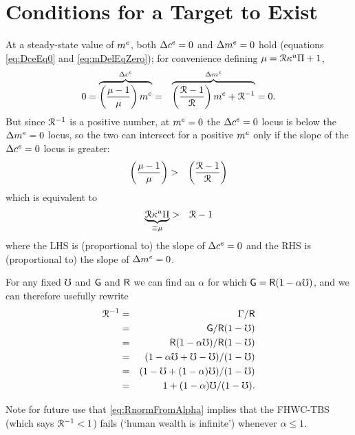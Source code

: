 \message{ !name(TractableBufferStock.tex)}\documentclass{handout}
\begin{document}
\section{Conditions for a Target to Exist}\label{sec:mTargExists}
 
At a steady-state value of $m^{e}$, both $\Delta c^{e}=0$ and $\Delta m^{e}=0$ hold (equations \eqref{eq:DceEq0} and \eqref{eq:mDelEqZero}); for convenience defining $\mu = \mathcal{R} \kappa^{u} \Pi + 1$, 
\begin{eqnarray}
  0 = \overbrace{\left(\frac{\mu-1}{\mu}\right) m^{e}}^{\Delta c^{e} } & = & \overbrace{\left(\frac{\mathcal{R}-1}{\mathcal{R}}\right)m^{e} + \mathcal{R}^{-1}}^{\Delta m^{e}} = 0.
\end{eqnarray}
But since $\mathcal{R}^{-1}$ is a positive number, at $m^{e}=0$ the $\Delta c^{e}=0$ locus is below the $\Delta m^{e}=0$ locus, so the two can intersect for a positive $m^{e}$ only if the slope of the $\Delta c^{e}=0$ locus is greater:
\begin{eqnarray}
  \left(\frac{\mu-1}{\mu}\right) & > & \left(\frac{\mathcal{R}-1}{\mathcal{R}}\right) \label{eq:cDelEq0SlopeCond}
\end{eqnarray}
which is equivalent to 
\begin{eqnarray}
  \underbrace{\mathcal{R} \kappa^{u} \Pi}_{\equiv \mu} & > &  \mathcal{R}-1  \label{eq:cDelEq0SlopeCondAlt}
\end{eqnarray}
where the LHS is (proportional to) the slope of $\Delta c^{e}=0$ and the RHS is (proportional to) the slope of $\Delta m^{e}=0$.

For any fixed $\mho$ and $\mathsf{G}$ and $\mathsf{R}$ we can find an $\alpha$ for which $\mathsf{G} = \mathsf{R} (1-\alpha \mho)$, and we can therefore usefully rewrite
\begin{eqnarray}
  \mathcal{R}^{-1} & = & \Gamma/\mathsf{R}
\\ & = & \mathsf{G}/\mathsf{R}(1-\mho)
\\ & = & \mathsf{R}(1-\alpha \mho)/\mathsf{R}(1-\mho)
\\ & = & (1-\alpha \mho + \mho - \mho)/(1-\mho)
\\ & = & (1-\mho+(1-\alpha) \mho)/(1-\mho)
\\ & = & 1+(1-\alpha)\mho/(1-\mho) \label{eq:RnormFromAlpha}
.
\end{eqnarray}

Note for future use that \eqref{eq:RnormFromAlpha} implies that the FHWC-TBS (which says $\mathcal{R}^{-1} < 1$) fails (`human wealth is infinite') whenever $\alpha \leq 1$.  
\end{document}
